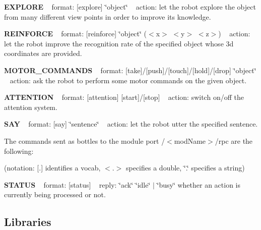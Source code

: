 {\bfseries E\+X\+P\+L\+O\+RE} ~\newline
format\+: \mbox{[}explore\mbox{]} \char`\"{}object\char`\"{} ~\newline
action\+: let the robot explore the object from many different view points in order to improve its knowledge.

{\bfseries R\+E\+I\+N\+F\+O\+R\+CE} ~\newline
format\+: \mbox{[}reinforce\mbox{]} \char`\"{}object\char`\"{} ($<$x$>$ $<$y$>$ $<$z$>$) ~\newline
action\+: let the robot improve the recognition rate of the specified object whose 3d coordinates are provided.

{\bfseries M\+O\+T\+O\+R\+\_\+\+C\+O\+M\+M\+A\+N\+DS} ~\newline
format\+: \mbox{[}take\mbox{]}/\mbox{[}push\mbox{]}/\mbox{[}touch\mbox{]}/\mbox{[}hold\mbox{]}/\mbox{[}drop\mbox{]} \char`\"{}object\char`\"{} ~\newline
action\+: ask the robot to perform some motor commands on the given object.

{\bfseries A\+T\+T\+E\+N\+T\+I\+ON} ~\newline
format\+: \mbox{[}attention\mbox{]} \mbox{[}start\mbox{]}/\mbox{[}stop\mbox{]} ~\newline
action\+: switch on/off the attention system.

{\bfseries S\+AY} ~\newline
format\+: \mbox{[}say\mbox{]} \char`\"{}sentence\char`\"{} ~\newline
action\+: let the robot utter the specified sentence.

The commands sent as bottles to the module port /$<$mod\+Name$>$/rpc are the following\+:

(notation\+: \mbox{[}.\mbox{]} identifies a vocab, $<$.$>$ specifies a double, \char`\"{}.\char`\"{} specifies a string)

{\bfseries S\+T\+A\+T\+US} ~\newline
format\+: \mbox{[}status\mbox{]} ~\newline
reply\+: \char`\"{}ack\char`\"{} \char`\"{}idle\char`\"{} $\vert$ \char`\"{}busy\char`\"{} whether an action is currently being processed or not.\hypertarget{group__icub__iolStateMachineHandler_lib_sec}{}\subsection{Libraries}\label{group__icub__iolStateMachineHandler_lib_sec}

